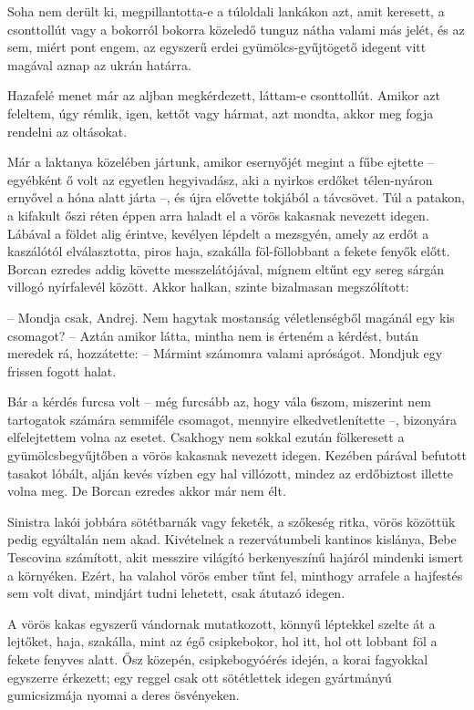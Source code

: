 \documentclass{IEEEtran}
\begin{document}
Soha nem derült ki, megpillantotta-e a túloldali lankákon azt, amit keresett,
a csonttollút vagy a bokorról bokorra közeledő tunguz nátha valami más jelét,
és az sem, miért pont engem, az egyszerű erdei gyümölcs-gyűjtögető idegent
vitt magával aznap az ukrán határra.

Hazafelé menet már az aljban megkérdezett, láttam-e csonttollút. Amikor azt
feleltem, úgy rémlik, igen, kettőt vagy hármat, azt mondta, akkor meg fogja
rendelni az oltásokat.

Már a laktanya közelében jártunk, amikor esernyőjét megint a fűbe ejtette –
egyébként ő volt az egyetlen hegyivadász, aki a nyirkos erdőket télen-nyáron
ernyővel a hóna alatt járta –, és újra elővette tokjából a távcsövet. Túl a
patakon, a kifakult őszi réten éppen arra haladt el a vörös kakasnak nevezett
idegen. Lábával a földet alig érintve, kevélyen lépdelt a mezsgyén, amely az
erdőt a kaszálótól elválasztotta, piros haja, szakálla föl-föllobbant a fekete
fenyők előtt. Borcan ezredes addig követte messzelátójával, mígnem eltűnt egy
sereg sárgán villogó nyírfalevél között. Akkor halkan, szinte bizalmasan
megszólított:

– Mondja csak, Andrej. Nem hagytak mostanság véletlenségből magánál egy kis
csomagot? – Aztán amikor látta, mintha nem is érteném a kérdést, bután meredek
rá, hozzátette: – Mármint számomra valami apróságot. Mondjuk egy frissen
fogott halat.

Bár a kérdés furcsa volt – még furcsább az, hogy vála 6szom, miszerint nem
tartogatok számára semmiféle csomagot, mennyire elkedvetlenítette –, bizonyára
elfelejtettem volna az esetet. Csakhogy nem sokkal ezután fölkeresett a
gyümölcsbegyűjtőben a vörös kakasnak nevezett idegen. Kezében párával befutott
tasakot lóbált, alján kevés vízben egy hal villózott, mindez az erdőbiztost
illette volna meg. De Borcan ezredes akkor már nem élt.

Sinistra lakói jobbára sötétbarnák vagy feketék, a szőkeség ritka, vörös
közöttük pedig egyáltalán nem akad. Kivételnek a rezervátumbeli kantinos
kislánya, Bebe Tescovina számított, akit messzire világító berkenyeszínű
hajáról mindenki ismert a környéken. Ezért, ha valahol vörös ember tűnt fel,
minthogy arrafele a hajfestés sem volt divat, mindjárt tudni lehetett, csak
átutazó idegen.

A vörös kakas egyszerű vándornak mutatkozott, könnyű léptekkel szelte át a
lejtőket, haja, szakálla, mint az égő csipkebokor, hol itt, hol ott lobbant
föl a fekete fenyves alatt. Ősz közepén, csipkebogyóérés idején, a korai
fagyokkal egyszerre érkezett; egy reggel csak ott sötétlettek idegen
gyártmányú gumicsizmája nyomai a deres ösvényeken.
\end{document}
